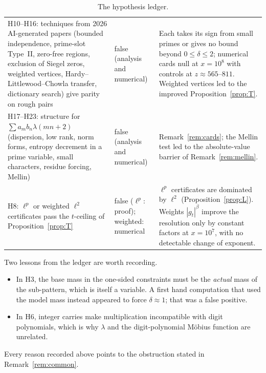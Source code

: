 \begin{table}[H]
\begin{tabular}{p{3.4cm}p{1.6cm}p{7.4cm}}
H10--H16: techniques from 2026 AI-generated papers (bounded independence, prime-slot Type~II, zero-free regions, exclusion of Siegel zeros, weighted vertices, Hardy--Littlewood--Chowla transfer, dictionary search) give parity on rough pairs & false (analysis and numerical) & Each takes its sign from small primes or gives no bound beyond $0\le\delta\le2$; numerical cards null at $x=10^8$ with controls at $z\approx565$--$811$. Weighted vertices led to the improved Proposition~\ref{prop:T}.\\
H17--H23: structure for $\sum a_mb_n\lambda(mn+2)$ (dispersion, low rank, norm forms, entropy decrement in a prime variable, small characters, residue forcing, Mellin) & false (analysis and numerical) & Remark~\ref{rem:cards}; the Mellin test led to the absolute-value barrier of Remark~\ref{rem:mellin}.\\
H8: $\ell^p$ or weighted $\ell^2$ certificates pass the $t$-ceiling of Proposition~\ref{prop:T} & false ($\ell^p$: proof); weighted: numerical & $\ell^p$ certificates are dominated by $\ell^2$ (Proposition~\ref{prop:L}). Weights $|g_t|^\beta$ improve the resolution only by constant factors at $x=10^7$, with no detectable change of exponent.\\
\bottomrule
\end{tabular}
\caption{The hypothesis ledger.}
\label{tab:hledger}
\end{table}

\noindent Two lessons from the ledger are worth recording.
\begin{itemize}
\item In H3, the base mass in the one-sided constraints must be the \emph{actual} mass of the sub-pattern, which is itself a variable. A first hand computation that used the model mass instead appeared to force $\delta\approx1$; that was a false positive.
\item In H6, integer carries make multiplication incompatible with digit polynomials, which is why $\lambda$ and the digit-polynomial Möbius function are unrelated.
\end{itemize}
Every reason recorded above points to the obstruction stated in Remark~\ref{rem:common}.

